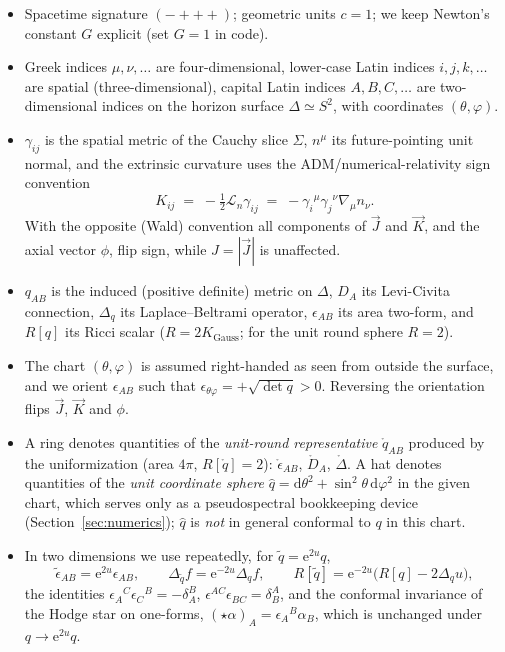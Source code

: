 \documentclass[11pt]{article}
\newcommand{\dd}{\mathrm{d}}
\newcommand{\ee}{\mathrm{e}}
\newcommand{\Lie}{\mathcal{L}}
\newcommand{\qo}{\mathring{q}}          %
\newcommand{\epso}{\mathring{\epsilon}} %
\newcommand{\Do}{\mathring{D}}          %
\newcommand{\Lapo}{\mathring{\Delta}}   %
\newcommand{\vJ}{\vec{J}}
\newcommand{\vK}{\vec{K}}
\begin{document}
\begin{itemize}
\item Spacetime signature $({-}{+}{+}{+})$; geometric units $c=1$; we keep
  Newton's constant $G$ explicit (set $G=1$ in code).
\item Greek indices $\mu,\nu,\dots$ are four-dimensional, lower-case Latin
  indices $i,j,k,\dots$ are spatial (three-dimensional), capital Latin indices
  $A,B,C,\dots$ are two-dimensional indices on the horizon surface
  $\Delta\simeq S^2$, with coordinates $(\theta,\varphi)$.
\item $\gamma_{ij}$ is the spatial metric of the Cauchy slice $\Sigma$,
  $n^\mu$ its future-pointing unit normal, and the extrinsic curvature uses
  the ADM/numerical-relativity sign convention
  \begin{equation}
    K_{ij} \;=\; -\tfrac12 \Lie_n \gamma_{ij}
            \;=\; -\gamma_i{}^\mu \gamma_j{}^\nu \nabla_\mu n_\nu .
    \label{eq:Kconvention}
  \end{equation}
  With the opposite (Wald) convention all components of $\vJ$ and $\vK$, and
  the axial vector $\phi$, flip sign, while $J=|\vJ|$ is unaffected.
\item $q_{AB}$ is the induced (positive definite) metric on $\Delta$, $D_A$
  its Levi-Civita connection, $\Delta_q$ its Laplace--Beltrami operator,
  $\epsilon_{AB}$ its area two-form, and $R[q]$ its Ricci scalar
  ($R=2K_{\mathrm{Gauss}}$; for the unit round sphere $R=2$).
\item The chart $(\theta,\varphi)$ is assumed right-handed as seen from
  outside the surface, and we orient $\epsilon_{AB}$ such that
  $\epsilon_{\theta\varphi}=+\sqrt{\det q}>0$.  Reversing the orientation
  flips $\vJ$, $\vK$ and $\phi$.
\item A ring denotes quantities of the \emph{unit-round representative}
  $\qo_{AB}$ produced by the uniformization (area $4\pi$, $R[\qo]=2$):
  $\epso_{AB}$, $\Do_A$, $\Lapo$.  A hat denotes quantities of the
  \emph{unit coordinate sphere} $\hat q = \dd\theta^2 +
  \sin^2\!\theta\,\dd\varphi^2$ in the given chart, which serves only as a
  pseudospectral bookkeeping device (Section~\ref{sec:numerics}); $\hat q$ is
  \emph{not} in general conformal to $q$ in this chart.
\item In two dimensions we use repeatedly, for $\tilde q = \ee^{2u} q$,
  \begin{equation}
    \tilde\epsilon_{AB} = \ee^{2u}\epsilon_{AB},\qquad
    \Delta_{\tilde q} f = \ee^{-2u}\Delta_q f,\qquad
    R[\tilde q] = \ee^{-2u}\bigl(R[q] - 2\Delta_q u\bigr),
    \label{eq:confidentities}
  \end{equation}
  the identities $\epsilon_A{}^C \epsilon_C{}^B = -\delta_A^B$,
  $\epsilon^{AC}\epsilon_{BC} = \delta^A_B$, and the conformal invariance of
  the Hodge star on one-forms, $(\star\alpha)_A = \epsilon_A{}^B \alpha_B$,
  which is unchanged under $q \to \ee^{2u} q$.
\end{itemize}
\end{document}
